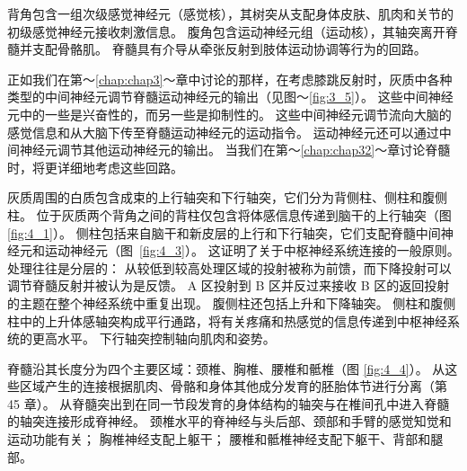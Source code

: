 背角包含一组次级感觉神经元（感觉核），其树突从支配身体皮肤、肌肉和关节的初级感觉神经元接收刺激信息。
腹角包含运动神经元组（运动核），其轴突离开脊髓并支配骨骼肌。
脊髓具有介导从牵张反射到肢体运动协调等行为的回路。


正如我们在第～\ref{chap:chap3}～章中讨论的那样，在考虑膝跳反射时，灰质中各种类型的中间神经元调节脊髓运动神经元的输出（见图～\ref{fig:3_5}）。 
这些中间神经元中的一些是兴奋性的，而另一些是抑制性的。
这些中间神经元调节流向大脑的感觉信息和从大脑下传至脊髓运动神经元的运动指令。
运动神经元还可以通过中间神经元调节其他运动神经元的输出。
当我们在第～\ref{chap:chap32}～章讨论脊髓时，将更详细地考虑这些回路。


灰质周围的白质包含成束的上行轴突和下行轴突，它们分为背侧柱、侧柱和腹侧柱。
位于灰质两个背角之间的背柱仅包含将体感信息传递到脑干的上行轴突（图 \ref{fig:4_1}）。
侧柱包括来自脑干和新皮层的上行和下行轴突，它们支配脊髓中间神经元和运动神经元（图~\ref{fig:4_3}）。 
这证明了关于中枢神经系统连接的一般原则。
处理往往是分层的：
从较低到较高处理区域的投射被称为前馈，而下降投射可以调节脊髓反射并被认为是反馈。 
A 区投射到 B 区并反过来接收 B 区的返回投射的主题在整个神经系统中重复出现。 
腹侧柱还包括上升和下降轴突。 
侧柱和腹侧柱中的上升体感轴突构成平行通路，将有关疼痛和热感觉的信息传递到中枢神经系统的更高水平。 
下行轴突控制轴向肌肉和姿势。


脊髓沿其长度分为四个主要区域：颈椎、胸椎、腰椎和骶椎（图 \ref{fig:4_4}）。 
从这些区域产生的连接根据肌肉、骨骼和身体其他成分发育的胚胎体节进行分离（第 45 章）。 
从脊髓突出到在同一节段发育的身体结构的轴突与在椎间孔中进入脊髓的轴突连接形成脊神经。 
颈椎水平的脊神经与头后部、颈部和手臂的感觉知觉和运动功能有关； 
胸椎神经支配上躯干； 腰椎和骶椎神经支配下躯干、背部和腿部。

